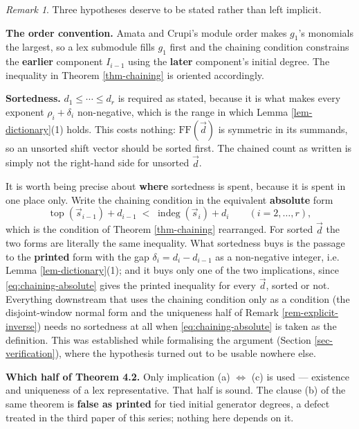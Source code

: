 \documentclass[11pt, a4paper, abstract=yes]{scrartcl}
\theoremstyle{definition}
\theoremstyle{remark}
\newtheorem{remark}[definition]{Remark}
\theoremstyle{plain}
\newcommand{\indeg}{\operatorname{indeg}}
\newcommand{\tp}{\operatorname{top}}
\begin{document}
\begin{remark}
Three hypotheses deserve to be stated rather than left implicit.

\textbf{The order convention.} Amata and Crupi's module order makes \(g_1\)'s monomials the largest, so a
lex submodule fills \(g_1\) first and the chaining condition constrains the \textbf{earlier} component
\(I_{i-1}\) using the \textbf{later} component's initial degree. The inequality in Theorem \ref{thm-chaining}
is oriented accordingly.

\textbf{Sortedness.} \(d_1\le\cdots\le d_r\) is required as stated, because it is what makes every exponent
\(\rho_i+\delta_i\) non-negative, which is the range in which Lemma \ref{lem-dictionary}(1) holds. This
costs nothing: \(\mathrm{FF}(\vec d)\) is symmetric in its summands, so an unsorted shift vector should be
sorted first. The chained count as written is simply not the right-hand side for unsorted \(\vec d\).

It is worth being precise about \textbf{where} sortedness is spent, because it is spent in one place only.
Write the chaining condition in the equivalent \textbf{absolute} form
\begin{equation}\label{eq:chaining-absolute}
  \tp(\vec s_{i-1})+d_{i-1}\;<\;\indeg(\vec s_i)+d_i \qquad(i=2,\dots,r),
\end{equation}
which is the condition of Theorem \ref{thm-chaining} rearranged. For sorted \(\vec d\) the two forms are literally
the same inequality. What sortedness buys is the passage to the \textbf{printed} form with the gap
\(\delta_i=d_i-d_{i-1}\) as a non-negative integer, i.e. Lemma \ref{lem-dictionary}(1); and it buys only
one of the two implications, since \eqref{eq:chaining-absolute} gives the printed inequality for every
\(\vec d\), sorted or not. Everything downstream that uses the chaining condition only as a condition
(the disjoint-window normal form and the uniqueness half of Remark
\ref{rem-explicit-inverse}) needs no sortedness at all when \eqref{eq:chaining-absolute} is taken as
the definition. This was established while formalising the argument (Section
\ref{sec-verification}), where the hypothesis turned out to be usable nowhere else.

\textbf{Which half of Theorem 4.2.} Only implication (a) \(\Leftrightarrow\) (c) is used --- existence and
uniqueness of a lex representative. That half is sound. The clause (b) of the same theorem is
\textbf{false as printed} for tied initial generator degrees, a defect treated in the third paper of this
series; nothing here depends on it.
\label{rem-sorted}
\end{remark}
\end{document}
